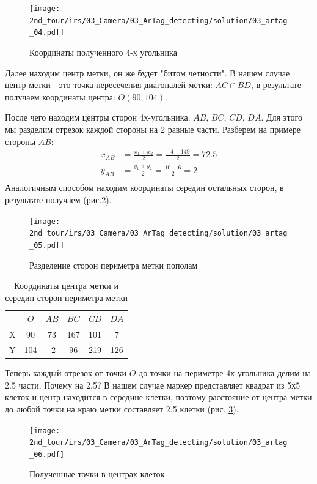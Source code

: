 \begin{figure}[h!]
	\centering
	\texttt{[image: 2nd\_tour/irs/03\_Camera/03\_ArTag\_detecting/solution/03\_artag\_04.pdf]}
	\caption{Координаты полученного 4-х угольника}
	\label{fig:03_artag_04}
\end{figure}

Далее находим центр метки, он же будет "битом четности". В нашем случае центр метки - это точка пересечения диагоналей метки: $AC \cap BD$, в результате получаем координаты центра: $O(90; 104)$.

После чего находим центры сторон 4х-угольника: $AB$, $BC$, $CD$, $DA$. Для этого мы разделим отрезок каждой стороны на 2 равные части. Разберем на примере стороны $AB$:
\begin{equation*}
\begin{aligned}
x_{AB} & = \frac{x_1 + x_2}{2} = \frac{-4 + 149}{2} = 72.5 \\
y_{AB} & = \frac{y_1 + y_2}{2} = \frac{10 - 6}{2} = 2 \\		
\end{aligned}
\end{equation*}
Аналогичным способом находим координаты середин остальных сторон, в результате получаем (рис.\ref{fig:03_artag_05}).
\begin{figure}[h!]
	\centering
	\texttt{[image: 2nd\_tour/irs/03\_Camera/03\_ArTag\_detecting/solution/03\_artag\_05.pdf]}
	\caption{Разделение сторон периметра метки пополам}
	\label{fig:03_artag_05}
\end{figure}

\begin{table}[h!]
	\begin{center}
		\begin{tabular}{|c|c|c|c|c|c|}
			\hline 
			& $O$ & $AB$ & $BC$ & $CD$ & $DA$\\
			\hline 
			X & 90 & 73 & 167 & 101 & 7 \\ 
			\hline 
			Y & 104 & -2 & 96 & 219 & 126 \\
			\hline 
		\end{tabular} 
		\caption{Координаты центра метки и середин сторон периметра метки}
	\end{center}
\end{table}

Теперь каждый отрезок от точки $O$ до точки на периметре 4х-угольника делим на 2.5 части. Почему на 2.5? В нашем случае маркер представляет квадрат из 5х5 клеток и центр находится в середине клетки, поэтому расстояние от центра метки до любой точки на краю метки составляет 2.5 клетки (рис. \ref{fig:03_artag_06}).
\\
\begin{figure}[h!]
	\centering
	\texttt{[image: 2nd\_tour/irs/03\_Camera/03\_ArTag\_detecting/solution/03\_artag\_06.pdf]}
	\caption{Полученные точки в центрах клеток}
	\label{fig:03_artag_06}
\end{figure}

